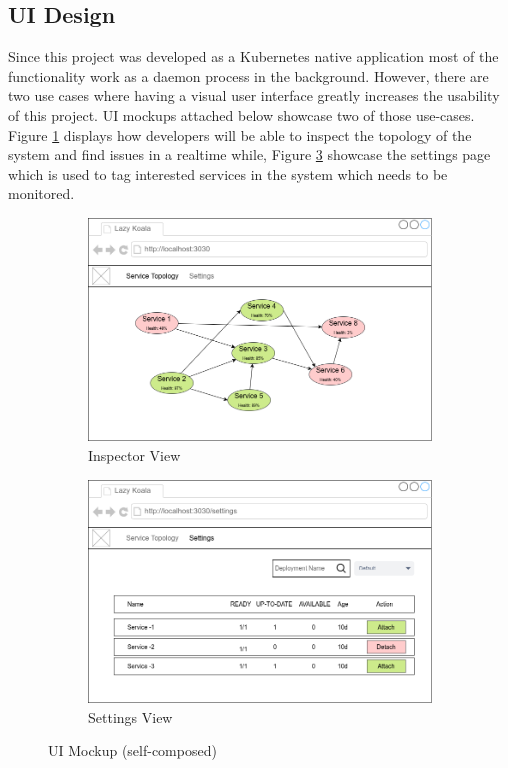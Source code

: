 \subsection{UI Design}

Since this project was developed as a Kubernetes native application most of the functionality work as a daemon process in the background. However, there are two use cases where having a visual user interface greatly increases the usability of this project. UI mockups attached below showcase two of those use-cases. Figure \ref{fig:ui-home} displays how developers will be able to inspect the topology of the system and find issues in a realtime while, Figure \ref{fig:ui-settings} showcase the settings page which is used to tag interested services in the system which needs to be monitored.

\begin{figure}[H]
    \centering
    \begin{subfigure}[b]{0.8\textwidth}
        \centering
        \includegraphics[width=\textwidth]{assets/system-design/ui-home.png}
        \caption{Inspector View}
        \label{fig:ui-home}
    \end{subfigure}
    \hfill
    \begin{subfigure}[b]{0.8\textwidth}
        \centering
        \includegraphics[width=\textwidth]{assets/system-design/ui-settings.png}
        \caption{Settings View}
        \label{fig:ui-settings}
    \end{subfigure}
    \hfill
    \caption{UI Mockup (self-composed)}
\end{figure}